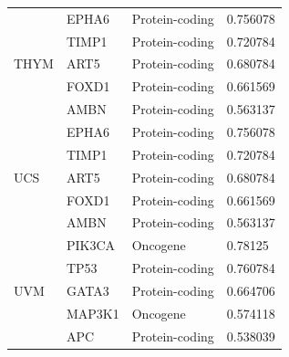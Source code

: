 \begin{table}
\begin{center}
{\begin{tabular}{l|l|l|l}
        \midrule
        \multirow{5}{*}{THYM}& EPHA6 & Protein-coding & 0.756078 \\ %
        & TIMP1 & Protein-coding & 0.720784 \\ %
        & ART5 & Protein-coding & 0.680784 \\ %
        & FOXD1 & Protein-coding & 0.661569 \\ %
        & AMBN & Protein-coding & 0.563137 \\ %
        \midrule
        \multirow{5}{*}{UCS}& EPHA6 & Protein-coding & 0.756078 \\ %
        & TIMP1 & Protein-coding & 0.720784 \\ %
        & ART5 & Protein-coding & 0.680784 \\ %
        & FOXD1 & Protein-coding & 0.661569 \\ %
        & AMBN & Protein-coding & 0.563137 \\ %
        \midrule
        \multirow{5}{*}{UVM} & PIK3CA & Oncogene & 0.78125 \\ %
        & TP53 & Protein-coding & 0.760784 \\ %
        & GATA3  & Protein-coding & 0.664706 \\ %
        & MAP3K1  & Oncogene & 0.574118 \\ %
        & APC  & Protein-coding & 0.538039 \\ 
        \end{tabular}}
        \vspace{-4mm}
    \end{center}
\end{table}


